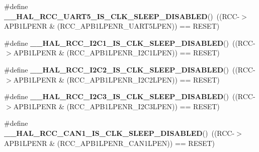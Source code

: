 \begin{DoxyCompactItemize}
\item 
\mbox{\label{group___r_c_c___clock___sleep___enable___disable___status_gab5d9590d92d52ff1aaa141bc565c6f84}} 
\#define {\bfseries \+\_\+\+\_\+\+H\+A\+L\+\_\+\+R\+C\+C\+\_\+\+U\+A\+R\+T5\+\_\+\+I\+S\+\_\+\+C\+L\+K\+\_\+\+S\+L\+E\+E\+P\+\_\+\+D\+I\+S\+A\+B\+L\+ED}()~((R\+CC-\/$>$A\+P\+B1\+L\+P\+E\+NR \& (R\+C\+C\+\_\+\+A\+P\+B1\+L\+P\+E\+N\+R\+\_\+\+U\+A\+R\+T5\+L\+P\+EN)) == R\+E\+S\+ET)
\item 
\mbox{\label{group___r_c_c___clock___sleep___enable___disable___status_ga133208873edc0be1774bf4f3c224a2ac}} 
\#define {\bfseries \+\_\+\+\_\+\+H\+A\+L\+\_\+\+R\+C\+C\+\_\+\+I2\+C1\+\_\+\+I\+S\+\_\+\+C\+L\+K\+\_\+\+S\+L\+E\+E\+P\+\_\+\+D\+I\+S\+A\+B\+L\+ED}()~((R\+CC-\/$>$A\+P\+B1\+L\+P\+E\+NR \& (R\+C\+C\+\_\+\+A\+P\+B1\+L\+P\+E\+N\+R\+\_\+\+I2\+C1\+L\+P\+EN)) == R\+E\+S\+ET)
\item 
\mbox{\label{group___r_c_c___clock___sleep___enable___disable___status_ga901cecc03cce495d9f01a7228a3bce1c}} 
\#define {\bfseries \+\_\+\+\_\+\+H\+A\+L\+\_\+\+R\+C\+C\+\_\+\+I2\+C2\+\_\+\+I\+S\+\_\+\+C\+L\+K\+\_\+\+S\+L\+E\+E\+P\+\_\+\+D\+I\+S\+A\+B\+L\+ED}()~((R\+CC-\/$>$A\+P\+B1\+L\+P\+E\+NR \& (R\+C\+C\+\_\+\+A\+P\+B1\+L\+P\+E\+N\+R\+\_\+\+I2\+C2\+L\+P\+EN)) == R\+E\+S\+ET)
\item 
\mbox{\label{group___r_c_c___clock___sleep___enable___disable___status_ga06401c2fc03285cb8a484569d0ec2f3a}} 
\#define {\bfseries \+\_\+\+\_\+\+H\+A\+L\+\_\+\+R\+C\+C\+\_\+\+I2\+C3\+\_\+\+I\+S\+\_\+\+C\+L\+K\+\_\+\+S\+L\+E\+E\+P\+\_\+\+D\+I\+S\+A\+B\+L\+ED}()~((R\+CC-\/$>$A\+P\+B1\+L\+P\+E\+NR \& (R\+C\+C\+\_\+\+A\+P\+B1\+L\+P\+E\+N\+R\+\_\+\+I2\+C3\+L\+P\+EN)) == R\+E\+S\+ET)
\item 
\mbox{\label{group___r_c_c___clock___sleep___enable___disable___status_gaeee7db1bdbc5961b955b9530a15e0545}} 
\#define {\bfseries \+\_\+\+\_\+\+H\+A\+L\+\_\+\+R\+C\+C\+\_\+\+C\+A\+N1\+\_\+\+I\+S\+\_\+\+C\+L\+K\+\_\+\+S\+L\+E\+E\+P\+\_\+\+D\+I\+S\+A\+B\+L\+ED}()~((R\+CC-\/$>$A\+P\+B1\+L\+P\+E\+NR \& (R\+C\+C\+\_\+\+A\+P\+B1\+L\+P\+E\+N\+R\+\_\+\+C\+A\+N1\+L\+P\+EN)) == R\+E\+S\+ET)

\end{DoxyCompactItemize}

